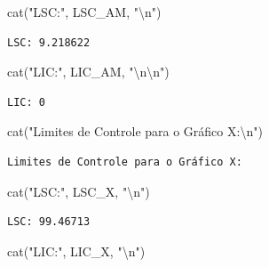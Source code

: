 \documentclass[
  letterpaper,
  DIV=11,
  numbers=noendperiod]{scrartcl}
\newenvironment{Shaded}{\begin{snugshade}}{\end{snugshade}}
\newcommand{\FunctionTok}[1]{\textcolor[rgb]{0.28,0.35,0.67}{#1}}
\newcommand{\NormalTok}[1]{\textcolor[rgb]{0.00,0.23,0.31}{#1}}
\newcommand{\SpecialCharTok}[1]{\textcolor[rgb]{0.37,0.37,0.37}{#1}}
\newcommand{\StringTok}[1]{\textcolor[rgb]{0.13,0.47,0.30}{#1}}
\begin{document}
\begin{Shaded}
\begin{Highlighting}[]
\FunctionTok{cat}\NormalTok{(}\StringTok{"LSC:"}\NormalTok{, LSC\_AM, }\StringTok{"}\SpecialCharTok{\textbackslash{}n}\StringTok{"}\NormalTok{)}
\end{Highlighting}
\end{Shaded}

\begin{verbatim}
LSC: 9.218622 
\end{verbatim}

\begin{Shaded}
\begin{Highlighting}[]
\FunctionTok{cat}\NormalTok{(}\StringTok{"LIC:"}\NormalTok{, LIC\_AM, }\StringTok{"}\SpecialCharTok{\textbackslash{}n\textbackslash{}n}\StringTok{"}\NormalTok{)}
\end{Highlighting}
\end{Shaded}

\begin{verbatim}
LIC: 0 
\end{verbatim}

\begin{Shaded}
\begin{Highlighting}[]
\FunctionTok{cat}\NormalTok{(}\StringTok{"Limites de Controle para o Gráfico X:}\SpecialCharTok{\textbackslash{}n}\StringTok{"}\NormalTok{)}
\end{Highlighting}
\end{Shaded}

\begin{verbatim}
Limites de Controle para o Gráfico X:
\end{verbatim}

\begin{Shaded}
\begin{Highlighting}[]
\FunctionTok{cat}\NormalTok{(}\StringTok{"LSC:"}\NormalTok{, LSC\_X, }\StringTok{"}\SpecialCharTok{\textbackslash{}n}\StringTok{"}\NormalTok{)}
\end{Highlighting}
\end{Shaded}

\begin{verbatim}
LSC: 99.46713 
\end{verbatim}

\begin{Shaded}
\begin{Highlighting}[]
\FunctionTok{cat}\NormalTok{(}\StringTok{"LIC:"}\NormalTok{, LIC\_X, }\StringTok{"}\SpecialCharTok{\textbackslash{}n}\StringTok{"}\NormalTok{)}
\end{Highlighting}
\end{Shaded}
\end{document}
